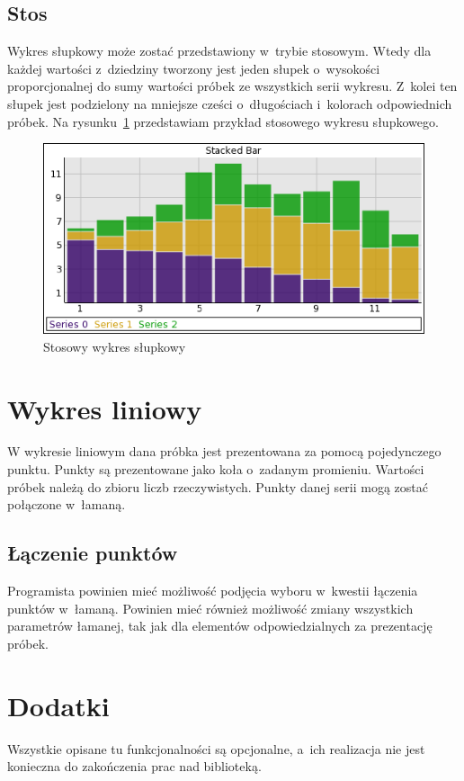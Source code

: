 \subsection{Stos}
Wykres słupkowy może zostać przedstawiony w~trybie stosowym. Wtedy dla każdej wartości z~dziedziny tworzony jest jeden słupek o~wysokości proporcjonalnej do sumy wartości próbek ze wszystkich serii wykresu. Z~kolei ten słupek jest podzielony na mniejsze cześci o~długościach i~kolorach odpowiednich próbek. Na rysunku~\ref{rys:wykres:stos} przedstawiam przykład stosowego wykresu słupkowego.

\begin{figure}[H]
\centering
\includegraphics[scale=0.8]{img/stacked-bar.png}
\caption{Stosowy wykres słupkowy}\label{rys:wykres:stos}
\end{figure}


\section{Wykres liniowy}
W wykresie liniowym dana próbka jest prezentowana za pomocą pojedynczego punktu. Punkty są prezentowane jako koła o~zadanym promieniu. Wartości próbek należą do zbioru liczb rzeczywistych. Punkty danej serii mogą zostać połączone w~łamaną.

\subsection{Łączenie punktów}
Programista powinien mieć możliwość podjęcia wyboru w~kwestii łączenia punktów w~łamaną. Powinien mieć również możliwość zmiany wszystkich parametrów łamanej, tak jak dla elementów odpowiedzialnych za prezentację próbek.

\section{Dodatki}
Wszystkie opisane tu funkcjonalności są opcjonalne, a~ich realizacja nie jest konieczna do zakończenia prac nad biblioteką.

